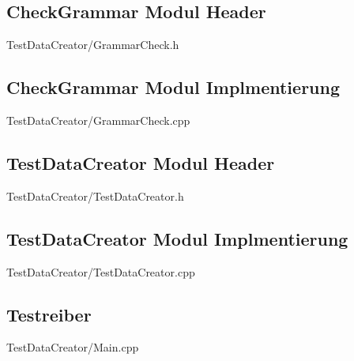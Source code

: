 \documentclass[10pt,a4paper, parskip=half]{scrartcl}
\begin{document}
\subsection{CheckGrammar Modul Header}

{TestDataCreator/GrammarCheck.h}

\subsection{CheckGrammar Modul Implmentierung}

{TestDataCreator/GrammarCheck.cpp}

\newpage
\subsection{TestDataCreator Modul Header}

{TestDataCreator/TestDataCreator.h}

\subsection{TestDataCreator Modul Implmentierung}

{TestDataCreator/TestDataCreator.cpp}

\newpage
\subsection{Testreiber}

{TestDataCreator/Main.cpp}
\end{document}
